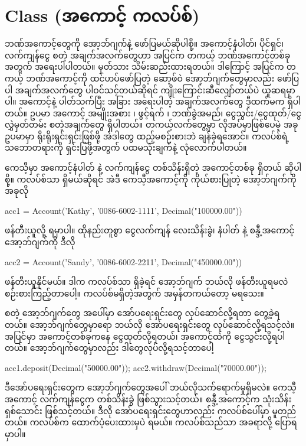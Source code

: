 \section{ Class (အကောင့် ကလပ်စ်)}
ဘဏ်အကောင့်တွေကို  အော့ဘ်ဂျက်နဲ့ ဖော်ပြမယ်ဆိုပါစို့။  အကောင့်နံပါတ်၊ ပိုင်ရှင်၊ လက်ကျန်\allowbreak ငွေ  စတဲ့ အချက်အလက်တွေဟာ အပြင်က တကယ့် ဘဏ်အကောင့်တစ်ခုအတွက် အရေးပါပါတယ်။ မှတ်သား သိမ်းဆည်းထားရတယ်။  ဒါကြောင့် အပြင်က တကယ့် ဘဏ်အကောင့်ကို ထင်ဟပ်ဖော်ပြတဲ့ ဆော့ဖ်ဝဲ အော့ဘ်ဂျက်တွေမှာလည်း ဖော်ပြပါ အချက်\allowbreak အလက်တွေ ပါဝင်သင့်တယ်ဆိုရင် ကျိုးကြောင်းဆီလျော်တယ်ပဲ ယူဆရမှာပါ။ အကောင့်နဲ့ ပါတ်သက်ပြီး အခြား အရေးပါတဲ့ အချက်\allowbreak အလက်တွေ ဒီ့ထက်မက ရှိပါတယ်။ ဥပမာ အကောင့် အမျိုးအစား  ၊ ဖွင့်ရက် ၊ ဘဏ်ခွဲအမည်၊ ငွေသွင်း/ငွေထုတ်/ငွေလွှဲမှတ်တမ်း စတဲ့အချက်တွေ ရှိပါတယ်။ တကယ့်လက်တွေ့မှာ လိုအပ်မှာဖြစ်ပေမဲ့ အခုဥပမာမှာ ရိုးရိုးရှင်းရှင်းဖြစ်ဖို့ အဲဒါတွေ ထည့်မစဉ်းစားဘဲ ချန်ခဲ့ရအောင်။ ကလပ်စ်ရဲ့ သဘောတရားကို ရှင်းပြဖို့အတွက် ပထမသုံးချက်နဲ့ လုံလောက်ပါတယ်။

ကေသီ့မှာ  အကောင့်နံပါတ်  နဲ့  လက်ကျန်ငွေ တစ်သိန်းရှိတဲ့ အကောင့်တစ်ခု ရှိတယ် ဆိုပါစို့။  ကလပ်စ်သာ ရှိမယ်ဆိုရင် အဲဒီ ကေသီ့အကောင့်ကို ကိုယ်စားပြုတဲ့ အော့ဘ်ဂျက်ကို အခုလို 
%
\begin{py}
acc1 = Account('Kathy',
               '0086-6002-1111',
               Decimal("100000.00"))
\end{py}
%
ဖန်တီးယူလို့ ရမှာပါ။ ထိုနည်းတူစွာ ငွေလက်ကျန် လေးသိန်းခွဲ၊ နံပါတ်  နဲ့  စန္ဒီ့အကောင့် အော့ဘ်ဂျက်ကို ဒီလို
%
\begin{py}
acc2 = Account('Sandy',
               '0086-6002-2211',
               Decimal("450000.00"))
\end{py}
% 
ဖန်တီးယူနိုင်မယ်။ ဒါက  ကလပ်စ်သာ ရှိခဲ့ရင် အော့ဘ်ဂျက် ဘယ်လို ဖန်တီးယူရမလဲ စဉ်းစားကြည့်တာပေါ့။  ကလပ်စ်မရှိတဲ့အတွက် အမှန်တကယ်တော့ မရသေး။ 


\fEn{,} \fEn{,} စတဲ့ အော့ဘ်ဂျက်တွေ အပေါ်မှာ အော်ပရေးရှင်းတွေ လုပ်ဆောင်လို့ရတာ တွေ့ခဲ့ရတယ်။  အော့ဘ်ဂျက်တွေမှာရော ဘယ်လို အော်ပရေးရှင်းတွေ လုပ်ဆောင်လို့ရသင့်လဲ။ အပြင်မှာ အကောင့်တစ်ခုကနေ ငွေထုတ်လို့ရတယ်၊ အကောင့်ထဲကို ငွေသွင်းလို့ရပါတယ်။  အော့ဘ်ဂျက်တွေမှာလည်း ဒါတွေလုပ်လို့ရသင့်တာပေါ့
%
\begin{py}
acc1.deposit(Decimal("50000.00"));
acc2.withdraw(Decimal("70000.00"));
\end{py}
%
ဒီအော်ပရေးရှင်းတွေက အော့ဘ်ဂျက်တွေအပေါ် ဘယ်လိုသက်ရောက်မှုရှိမလဲ။ ကေသီ့အကောင့် လက်\allowbreak ကျန်ငွေက တစ်သိန်းခွဲ ဖြစ်သွားသင့်တယ်။ စန္ဒီ့အကောင့်က သုံးသိန်းရှစ်သောင်း ဖြစ်သင့်တယ်။ ဒီလို အော်ပရေးရှင်းတွေဟာလည်း ကလပ်စ်ပေါ်မှာ မူတည်တယ်။ ကလပ်စ်က ထောက်ပံ့ပေးထားမှပဲ ရမယ်။ ကလပ်စ်သည်သာ အခရာလို့ ပြောရမှာပါ။

